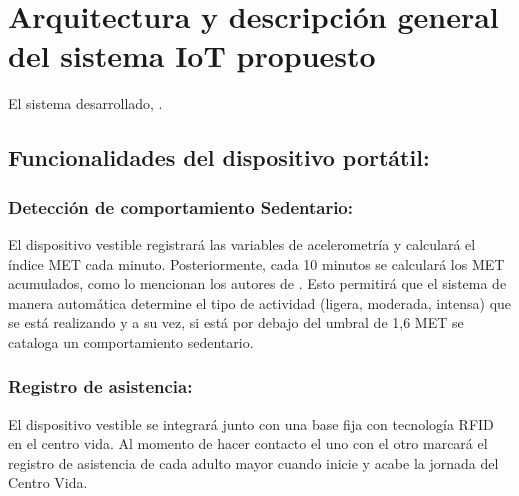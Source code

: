 \newpage
\section{Arquitectura y descripción general del sistema IoT propuesto}

El sistema desarrollado, .\hfill\break





\subsection{Funcionalidades del dispositivo portátil:}

\subsubsection{Detección de comportamiento Sedentario:}El dispositivo vestible registrará las variables de acelerometría y calculará el índice MET cada minuto. Posteriormente, cada 10 minutos se calculará los MET acumulados, como lo mencionan los autores de \cite{MET2}. Esto permitirá que el sistema de manera automática determine el tipo de actividad (ligera, moderada, intensa) que se está realizando y a su vez, si está por debajo del umbral de 1,6 MET se cataloga un comportamiento sedentario. %
\subsubsection{Registro de asistencia:} El dispositivo vestible se integrará junto con una base fija con tecnología RFID en el centro vida. Al momento de hacer contacto el uno con el otro marcará el registro de asistencia de cada adulto mayor cuando inicie y acabe la jornada del Centro Vida.


 









